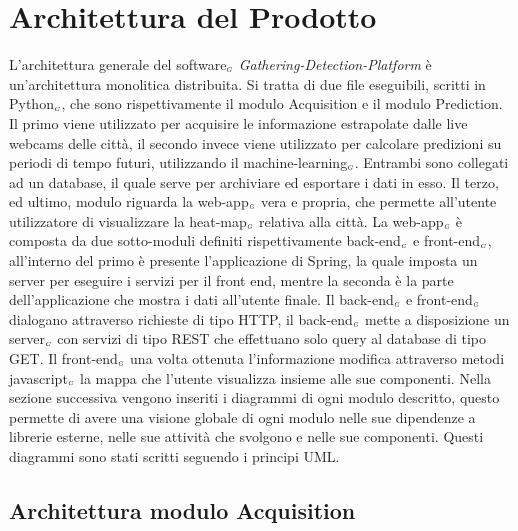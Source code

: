 \chapter{Architettura del Prodotto}\label{ArchitetturaDelProdotto}
L'architettura generale del software$_{\scaleto{G}{3pt}}$ \textit{Gathering-Detection-Platform} è un'architettura monolitica distribuita.
Si tratta di due file eseguibili, scritti in Python$_{\scaleto{G}{3pt}}$, che sono rispettivamente il modulo Acquisition e il modulo Prediction.
Il primo viene utilizzato per acquisire le informazione estrapolate dalle live webcams delle città, il secondo invece viene utilizzato per calcolare predizioni su periodi di tempo futuri, utilizzando il machine-learning$_{\scaleto{G}{3pt}}$.
Entrambi sono collegati ad un database, il quale serve per archiviare ed esportare i dati in esso.
Il terzo, ed ultimo, modulo riguarda la web-app$_{\scaleto{G}{3pt}}$ vera e propria, che permette all'utente utilizzatore di visualizzare la heat-map$_{\scaleto{G}{3pt}}$ relativa alla città.
La web-app$_{\scaleto{G}{3pt}}$ è composta da due sotto-moduli definiti rispettivamente back-end$_{\scaleto{G}{3pt}}$ e front-end$_{\scaleto{G}{3pt}}$, all'interno del primo è presente l'applicazione di Spring, la quale imposta un server per eseguire i servizi per il front end, mentre la seconda è la parte dell'applicazione che mostra i dati all'utente finale. Il back-end$_{\scaleto{G}{3pt}}$ e front-end$_{\scaleto{G}{3pt}}$ dialogano attraverso richieste di tipo HTTP, il back-end$_{\scaleto{G}{3pt}}$ mette a disposizione un server$_{\scaleto{G}{3pt}}$ con servizi di tipo REST che effettuano solo query al database di tipo GET. Il front-end$_{\scaleto{G}{3pt}}$ una volta ottenuta l'informazione modifica attraverso metodi javascript$_{\scaleto{G}{3pt}}$ la mappa che l'utente visualizza insieme alle sue componenti.
Nella sezione successiva vengono inseriti i diagrammi di ogni modulo descritto, questo permette di avere una visione globale di ogni modulo nelle sue dipendenze a librerie esterne, nelle sue attività che svolgono e nelle sue componenti. Questi diagrammi sono stati scritti seguendo i principi UML.

\section{Architettura modulo Acquisition}\label{ArchitetturaDelProdottoArchitetturaModuloAcquisition}
